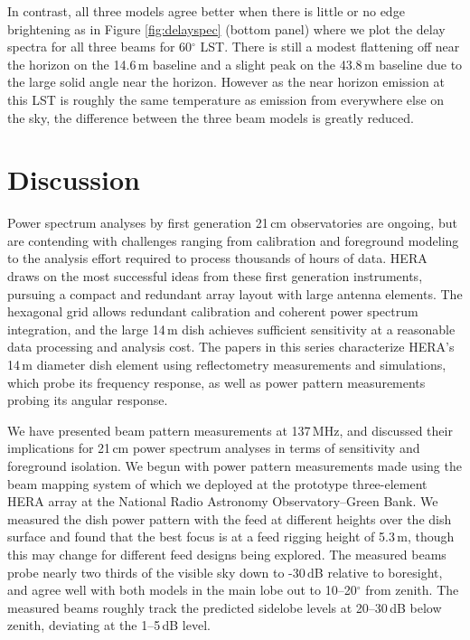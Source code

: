 \documentclass{emulateapj}
\begin{document}
In contrast, all three models agree better when there is little or no edge brightening as in Figure \ref{fig:delayspec} (bottom panel) where we plot the delay spectra for all three beams for 60$^\circ$ LST. There is still a modest flattening off near the horizon on the 14.6\,m baseline and a slight peak on the 43.8\,m baseline due to the large solid angle near the horizon. However as the near horizon emission at this LST is roughly the same temperature as emission from everywhere else on the sky, the difference between the three beam models is greatly reduced.

\section{Discussion}

Power spectrum analyses by first generation 21\,cm observatories are ongoing, but are contending with challenges ranging from calibration and foreground modeling to the analysis effort required to process thousands of hours of data. HERA draws on the most successful ideas from these first generation instruments, pursuing a compact and redundant array layout with large antenna elements. The hexagonal grid allows redundant calibration and coherent power spectrum integration, and the large 14\,m dish achieves sufficient sensitivity at a reasonable data processing and analysis cost. The papers in this series characterize HERA's 14\,m diameter dish element using reflectometry measurements and simulations, which probe its frequency response, as well as power pattern measurements probing its angular response. 

We have presented beam pattern measurements at 137\,MHz, and discussed their implications for 21\,cm power spectrum analyses in terms of sensitivity and foreground isolation. We begun with power pattern measurements made using the beam mapping system of \citet{neben15} which we deployed at the prototype three-element HERA array at the National Radio Astronomy Observatory--Green Bank. We measured the dish power pattern with the feed at different heights over the dish surface and found that the best focus is at a feed rigging height of 5.3\,m, though this may change for different feed designs being explored\citep{feedoptimizationmemo}. The measured beams probe nearly two thirds of the visible sky down to -30\,dB relative to boresight, and agree well with both models in the main lobe out to 10--20$^\circ$ from zenith. The measured beams roughly track the predicted sidelobe levels at 20--30\,dB below zenith, deviating at the 1--5\,dB level.
\end{document}
